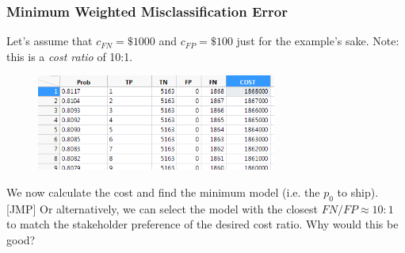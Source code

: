 \documentclass[handout]{beamer}
\begin{document}
\begin{frame}\frametitle{Minimum Weighted Misclassification Error}

Let's assume that $c_{FN} = \$1000$ and $c_{FP} = \$100$ just for the example's sake. Note: this is a \emph{cost ratio} of 10:1.

\vspace{-0.2cm}
\begin{figure}
\centering
\hspace{-0.5cm}\includegraphics[width=3.1in]{weighted_misclassification_costs.png}
\end{figure}

We now calculate the cost and find the minimum model (i.e. the $p_0$ to ship). [JMP] \pause Or alternatively, we can select the model with the closest $FN / FP \approx 10:1$ to match the stakeholder preference of the desired cost ratio. Why would this be good?



	
\end{frame}
\end{document}
